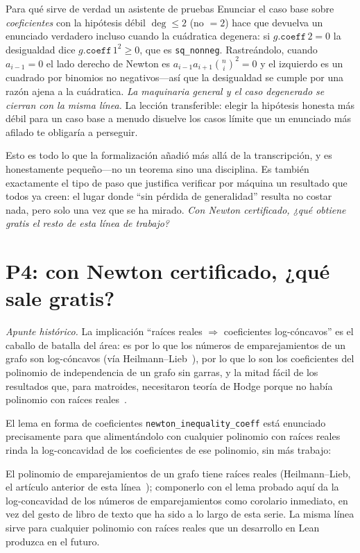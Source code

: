 \documentclass[11pt]{article}
\newcommand{\lean}[1]{\texttt{#1}}
\newcommand{\keyeq}[1]{\begin{center}\keybox{$\displaystyle #1$}\end{center}}
\begin{document}
\begin{recipebox}{Para qu\'e sirve de verdad un asistente de pruebas}
Enunciar el caso base sobre \emph{coeficientes} con la hip\'otesis d\'ebil $\deg\le2$ (no $=2$) hace
que devuelva un enunciado verdadero incluso cuando la cu\'adratica degenera: si
$g.\mathtt{coeff}\,2=0$ la desigualdad dice $g.\mathtt{coeff}\,1^2\ge0$, que es \lean{sq\_nonneg}.
Rastre\'andolo, cuando $a_{i-1}=0$ el lado derecho de Newton es $a_{i-1}a_{i+1}\binom{n}{i}^2=0$ y el
izquierdo es un cuadrado por binomios no negativos---as\'i que la desigualdad se cumple por una
raz\'on ajena a la cu\'adratica. \emph{La maquinaria general y el caso degenerado se cierran con la
misma l\'inea.} La lecci\'on transferible: elegir la hip\'otesis honesta m\'as d\'ebil para un caso
base a menudo disuelve los casos l\'imite que un enunciado m\'as afilado te obligar\'ia a perseguir.
\end{recipebox}

Esto es todo lo que la formalizaci\'on a\~nadi\'o m\'as all\'a de la transcripci\'on, y es
honestamente peque\~no---no un teorema sino una disciplina. Es tambi\'en exactamente el tipo de paso
que justifica verificar por m\'aquina un resultado que todos ya creen: el lugar donde ``sin p\'erdida
de generalidad'' resulta no costar nada, pero solo una vez que se ha mirado. \emph{Con Newton
certificado, ¿qu\'e obtiene gratis el resto de esta l\'inea de trabajo?}

\section{P4: con Newton certificado, ¿qu\'e sale gratis?}\label{sec:corollaries}

\emph{Apunte hist\'orico.} La implicaci\'on ``ra\'ices reales $\Rightarrow$ coeficientes
log-c\'oncavos'' es el caballo de batalla del \'area: es por lo que los n\'umeros de emparejamientos
de un grafo son log-c\'oncavos (v\'ia Heilmann--Lieb~\cite{PartII}), por lo que lo son los
coeficientes del polinomio de independencia de un grafo sin garras, y la mitad f\'acil de los
resultados que, para matroides, necesitaron teor\'ia de Hodge porque no hab\'ia polinomio con
ra\'ices reales~\cite{AHK2018}.

El lema en forma de coeficientes \lean{newton\_inequality\_coeff} est\'a enunciado precisamente para
que aliment\'andolo con cualquier polinomio con ra\'ices reales rinda la log-concavidad de los
coeficientes de ese polinomio, sin m\'as trabajo:
\keyeq{\text{ra\'ices reales}\;\Longrightarrow\;\text{coeficientes log-c\'oncavos}.}
El polinomio de emparejamientos de un grafo tiene ra\'ices reales (Heilmann--Lieb, el art\'iculo
anterior de esta l\'inea~\cite{PartII}); componerlo con el lema probado aqu\'i da la log-concavidad
de los n\'umeros de emparejamientos como corolario inmediato, en vez del gesto de libro de texto que
ha sido a lo largo de esta serie. La misma l\'inea sirve para cualquier polinomio con ra\'ices
reales que un desarrollo en Lean produzca en el futuro.
\end{document}
